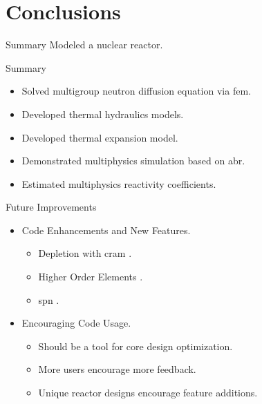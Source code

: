 \section{Conclusions}
\label{sec:conclusions}

\begin{frame}{Summary}
  \huge Modeled a nuclear reactor.
\end{frame}

\begin{frame}{Summary}
  \begin{itemize}
    \item Solved multigroup neutron diffusion equation via \gls{fem}.
    \item Developed thermal hydraulics models.
    \item Developed thermal expansion model.
    \item Demonstrated multiphysics simulation based on \gls{abr}.
    \item Estimated multiphysics reactivity coefficients.
  \end{itemize}
\end{frame}

\begin{frame}{Future Improvements}
  \begin{itemize}
    \item Code Enhancements and New Features.
    \begin{itemize}
      \item Depletion with \gls{cram} \cite{cram}.
      \item Higher Order Elements \cite{Hosseini2013}.
      \item \gls{spn} \cite{Ryu2013}.
    \end{itemize}
    \item Encouraging Code Usage.
    \begin{itemize}
      \item Should be a tool for core design optimization.
      \item More users encourage more feedback.
      \item Unique reactor designs encourage feature additions.
    \end{itemize}
  \end{itemize}
\end{frame}

